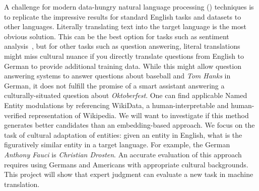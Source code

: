 \begin{comment}
First, we propose a new dataset that evaluates a machine translation model's ability to \textit{understand} coreference.  
%
\citet{ribeiro2020beyond}'s CheckList  challenges the assumption that quantitative accuracy is enough for model evaluation.  
%
Our work will extend this approach for machine translation and will serve as a way to compare models build on varying of data types; low-quality models will likely not have the reasoning necessary to predict synonyms and natural language variations that those created with experts would.  
%
The seemingly straightforward translation of 
the English pronoun \textit{it} into German requires knowledge at the syntactic, discourse and world knowledge levels for proper pronoun coreference resolution (\coref{}).
The German third person pronoun can have three genders, determined by its antecedent: masculine (\emph{er}), feminine (\emph{sie}) and neuter (\emph{es}).
%
Despite promising results for pronoun translation
\citep{bawden-etal-2018-evaluating,mueller2018,lopes2020document}, the question remains: Are neural models truly \textit{learning} this task, or are they exploiting simple heuristics to make a coreference prediction?
%
We will collaboratively build the dataset to answer this in question with American and German native speakers.  
Removed from proposal 
\end{comment}

%
%
A challenge for modern data-hungry natural language processing
() techniques is to replicate the impressive results for
standard English tasks and datasets to other languages.
%
Literally translating text into the target language is the most obvious solution.  
%
This can be the best option for tasks such as sentiment
analysis~\citep{araujo-16}, but for other tasks such as question
answering, literal translations might miss cultural nuance
if you directly translate questions from English to German to provide
additional training data.
%
While this might allow question answering systems to answer questions about
baseball and \textit{Tom Hanks} in German, it does not fulfill the promise of a
smart assistant answering a culturally-situated question about \textit{Oktoberfest}.
%
One can find applicable Named Entity modulations by referencing WikiData, a human-interpretable and human-verified representation of Wikipedia.
%
We will want to investigate if this method generates better candidates than an embedding-based approach.
%
We focus on the task of cultural adaptation of entities: given an
entity in English, what is the figuratively similar entity in a target language.
%
For example, the German \textit{Anthony Fauci} is
\textit{Christian Drosten}.
%
An accurate evaluation of this approach requires using Germans and Americans with appropriate cultural backgrounds.
%
This project will show that expert judgment can evaluate a new task in machine translation.


